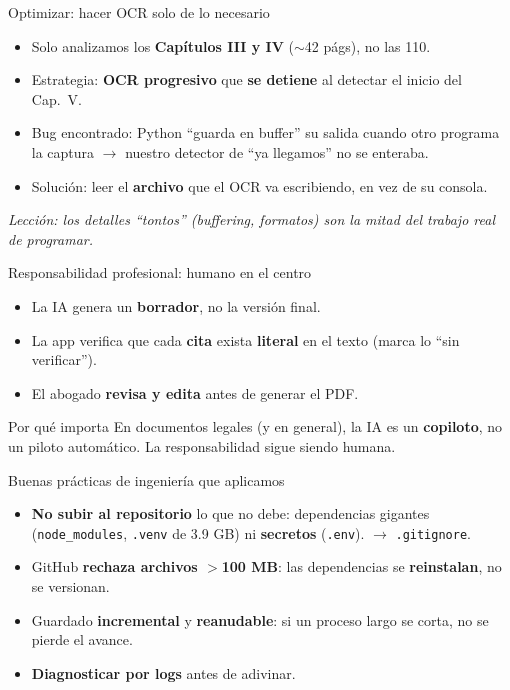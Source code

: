 \documentclass[10pt,aspectratio=169]{beamer}
\begin{document}
\begin{frame}{Optimizar: hacer OCR solo de lo necesario}
  \begin{itemize}
    \item Solo analizamos los \textbf{Capítulos III y IV} ($\sim$42 págs), no las 110.
    \item Estrategia: \textbf{OCR progresivo} que \textbf{se detiene} al detectar el inicio del Cap.~V.
    \item \textcolor{mal}{Bug encontrado:} Python ``guarda en buffer'' su salida cuando otro programa la captura $\rightarrow$ nuestro detector de ``ya llegamos'' no se enteraba.
    \item \textcolor{ok}{Solución:} leer el \textbf{archivo} que el OCR va escribiendo, en vez de su consola.
  \end{itemize}
  \vfill
  \centering\footnotesize\emph{Lección: los detalles ``tontos'' (buffering, formatos) son la mitad del trabajo real de programar.}
\end{frame}

\begin{frame}{Responsabilidad profesional: humano en el centro}
  \begin{itemize}
    \item La IA genera un \textbf{borrador}, no la versión final.
    \item La app verifica que cada \textbf{cita} exista \textbf{literal} en el texto (marca lo ``sin verificar'').
    \item El abogado \textbf{revisa y edita} antes de generar el PDF.
  \end{itemize}
  \begin{alertblock}{Por qué importa}
    En documentos legales (y en general), la IA es un \textbf{copiloto}, no un piloto automático. La responsabilidad sigue siendo humana.
  \end{alertblock}
\end{frame}

\begin{frame}{Buenas prácticas de ingeniería que aplicamos}
  \begin{itemize}
    \item \textbf{No subir al repositorio} lo que no debe: dependencias gigantes (\texttt{node\_modules}, \texttt{.venv} de 3.9 GB) ni \textbf{secretos} (\texttt{.env}). $\rightarrow$ \texttt{.gitignore}.
    \item GitHub \textbf{rechaza archivos $>$100 MB}: las dependencias se \textbf{reinstalan}, no se versionan.
    \item Guardado \textbf{incremental} y \textbf{reanudable}: si un proceso largo se corta, no se pierde el avance.
    \item \textbf{Diagnosticar por logs} antes de adivinar.
  \end{itemize}
\end{frame}
\end{document}
